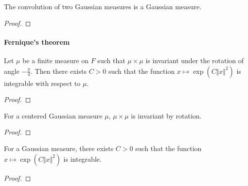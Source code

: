 \begin{lemma}\label{lem:isGaussian_conv}
  \mathlibok
The convolution of two Gaussian measures is a Gaussian measure.
\end{lemma}

\begin{proof}\leanok

\end{proof}



\paragraph{Fernique's theorem}


\begin{theorem}\label{thm:exists_integrable_exp_sq_of_map_rotation_eq_self}
  \mathlibok
Let $\mu$ be a finite measure on $F$ such that $\mu \times \mu$ is invariant under the rotation of angle $-\frac{\pi}{4}$.
Then there exists $C > 0$ such that the function $x \mapsto \exp (C \Vert x \Vert ^ 2)$ is integrable with respect to $\mu$.
\end{theorem}

\begin{proof}\leanok

\end{proof}


\begin{lemma}\label{lem:IsGaussian.map_rotation_eq_self}
  \mathlibok
For a centered Gaussian measure $\mu$, $\mu \times \mu$ is invariant by rotation.
\end{lemma}

\begin{proof}\leanok

\end{proof}


\begin{theorem}\label{thm:IsGaussian.exists_integrable_exp_sq}
  \mathlibok
For a Gaussian measure, there exists $C > 0$ such that the function $x \mapsto \exp (C \Vert x \Vert ^ 2)$ is integrable.
\end{theorem}

\begin{proof}\leanok

\end{proof}



